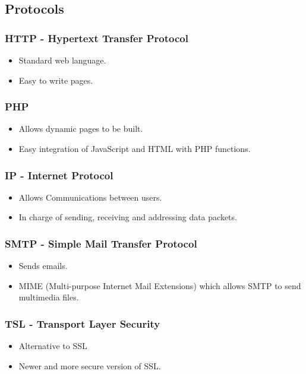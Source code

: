 \documentclass[12pt, oneside]{article}
\begin{document}
	\subsection{Protocols}
		\subsubsection{HTTP - Hypertext Transfer Protocol}
			\begin{itemize}
				\item Standard web language.
				\item Easy to write pages.
			\end{itemize}
		\subsubsection{PHP}
			\begin{itemize}
				\item Allows dynamic pages to be built.
				\item Easy integration of JavaScript and HTML with PHP functions.
			\end{itemize}
		\subsubsection{IP - Internet Protocol}	
			\begin{itemize}
				\item Allows Communications between users.
				\item In charge of sending, receiving and addressing data packets.
			\end{itemize}				
		\subsubsection{SMTP - Simple Mail Transfer Protocol}
			\begin{itemize}
				\item Sends emails.
				\item MIME (Multi-purpose Internet Mail Extensions) which allows SMTP to send multimedia files.
			\end{itemize}
		\subsubsection{TSL - Transport Layer Security}
			\begin{itemize}
				\item Alternative to SSL
				\item Newer and more secure version of SSL.
			\end{itemize}
		
\end{document}
